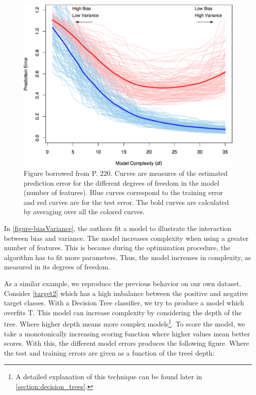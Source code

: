 
\begin{figure}[h!]
\begin{center}
\includegraphics[width=0.7\columnwidth]{figures/figure-biasVariance/figure-biasVariance}
\caption{ Figure borrowed from \protect\textcite{hastie-elemstatslearn} P. 220. Curves are measures of the estimated prediction error for the different degrees of freedom in the model (number of features). Blue curves correspond to the training error and red curves are for the test error. The bold curves are calculated by averaging over all the colored curves.%
}
\label{figure:biasVariance}
\end{center}
\end{figure}


In \cref{figure-biasVariance}, the authors fit a model to illustrate the interaction between bias and variance. The model increases complexity when using a greater number of features. This is because during the optimization procedure, the algorithm has to fit more parameters. Thus, the model increases in complexity, as measured in its degrees of freedom.

As a similar example, we reproduce the previous behavior on our own dataset.
Consider \cref{target2} which has a high imbalance between the positive and negative target classes.
With a Decision Tree classifier, we try to produce a model which overfits $\mathrm{T}$. This model can increase complexity by considering the depth of the tree. Where higher depth means more complex models\footnote{A detailed explanation of this technique can be found later in \cref{section:decision_trees}. }.
To score the model, we take a monotonically increasing scoring function where
higher values mean better scores.
With this, the different model errors produces the following figure. Where the test and training errors are given as a function of the tree\'s depth:

